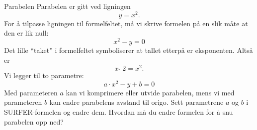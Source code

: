 \begin{surferPage}{Parabelen}
Parabelen er gitt ved ligningen \[y=x^2.\]
For å tilpasse ligningen til formelfeltet, må vi skrive formelen på en slik måte at den er lik null:
\[x^2-y=0\]
Det lille \enquote{taket} i formelfeltet symboliserer at tallet etterpå er eksponenten. Altså er
\[ x  \,\hat{\ } \, 2 =x^2.\]
Vi legger til to parametre:
\[a \cdot x^2-y+b=0\]
Med parameteren $a$ kan vi komprimere eller utvide parabelen, mens vi med parameteren $b$ kan endre parabelens avstand til origo. 
\newline
Sett parametrene $a$ og $b$ i SURFER-formelen og endre dem. Hvordan må du endre formelen for å snu parabelen opp ned?
\end{surferPage}
